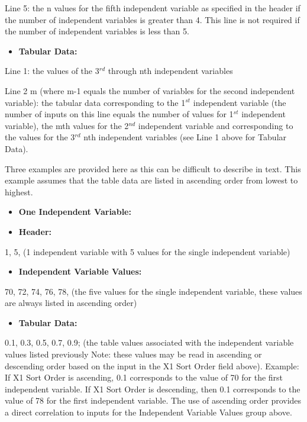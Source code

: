 Line 5: the n values for the fifth independent variable as specified in the header if the number of independent variables is greater than 4. This line is not required if the number of independent variables is less than 5.

\begin{itemize}
\tightlist
\item
  \textbf{Tabular Data:}
\end{itemize}

Line 1: the values of the 3\(^{rd}\) through nth independent variables

Line 2 m (where m-1 equals the number of variables for the second independent variable): the tabular data corresponding to the 1\(^{st}\) independent variable (the number of inputs on this line equals the number of values for 1\(^{st}\) independent variable), the mth values for the 2\(^{nd}\) independent variable and corresponding to the values for the 3\(^{rd}\) nth independent variables (see Line 1 above for Tabular Data).

Three examples are provided here as this can be difficult to describe in text. This example assumes that the table data are listed in ascending order from lowest to highest.

\begin{itemize}
\item
  \textbf{One Independent Variable:}
\item
  \textbf{Header:}
\end{itemize}

1, 5, (1 independent variable with 5 values for the single independent variable)

\begin{itemize}
\tightlist
\item
  \textbf{Independent Variable Values:}
\end{itemize}

70, 72, 74, 76, 78, (the five values for the single independent variable, these values are always listed in ascending order)

\begin{itemize}
\tightlist
\item
  \textbf{Tabular Data:}
\end{itemize}

0.1, 0.3, 0.5, 0.7, 0.9; (the table values associated with the independent variable values listed previously Note: these values may be read in ascending or descending order based on the input in the X1 Sort Order field above). Example: If X1 Sort Order is ascending, 0.1 corresponds to the value of 70 for the first independent variable. If X1 Sort Order is descending, then 0.1 corresponds to the value of 78 for the first independent variable. The use of ascending order provides a direct correlation to inputs for the Independent Variable Values group above.

